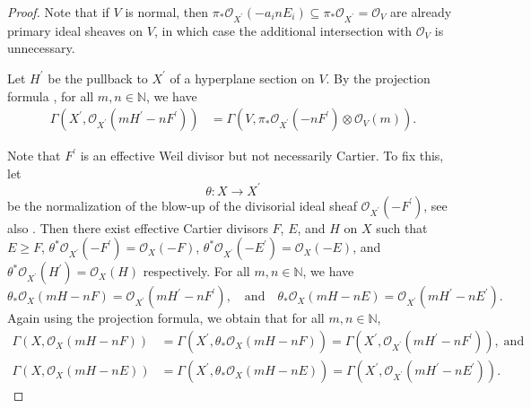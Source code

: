 \documentclass[12pt,a4paper]{amsart}
\theoremstyle{plain}
\theoremstyle{definition}
\numberwithin{equation}{theorem}
\begin{document}
\begin{proof}
Note that if $V$ is normal, then $\pi_*\mathcal{O}_{X^{\prime}}(-a_inE_i) \subseteq \pi_*\mathcal{O}_{X^{\prime}} = \mathcal{O}_{V}$ are already primary ideal sheaves on $V$, in which case the additional intersection with $\mathcal{O}_V$ is unnecessary.

Let $H^\prime$ be the pullback to $X^{\prime}$ of a hyperplane section on $V$. By the projection formula \cite[Chapter II, Exercise 5.1]{Har77}, for all $m,n\in\mathbb{N}$, we have
\begin{align}\label{reesval2}
 \Gamma\left(X^{\prime},\mathcal{O}_{X^{\prime}}(mH^{\prime}-nF^{\prime})\right) &= \Gamma\left(V,\pi_*\mathcal{O}_{X^{\prime}}(-nF^{\prime})\otimes \mathcal{O}_V(m)\right).
\end{align}

Note that $F^{\prime}$ is an effective Weil divisor but not necessarily Cartier. To fix this, let $$\theta\colon X \longrightarrow X^{\prime}$$ be the normalization of the blow-up of the divisorial ideal sheaf $\mathcal{O}_{X^{\prime}}(-F^{\prime})$, see also \cite[Corollary 3.4]{FKL16}. Then there exist effective Cartier divisors $F$, $E$, and $H$ on $X$ such that $E\geq F$, $\theta^*\mathcal{O}_{X^{\prime}}(-F^{\prime}) = \mathcal{O}_X(-F)$, $\theta^*\mathcal{O}_{X^{\prime}}(-E^{\prime}) = \mathcal{O}_X(-E)$, and $\theta^*\mathcal{O}_{X^{\prime}}(H^{\prime}) = \mathcal{O}_X(H)$ respectively. For all $m,n\in\mathbb{N}$, we have
\begin{equation}\label{reesval3}
\theta_*\mathcal{O}_{X}(mH-nF) = \mathcal{O}_{X^{\prime}}(mH^{\prime}-nF^{\prime}), \quad \text{and} \quad \theta_*\mathcal{O}_{X}(mH-nE) = \mathcal{O}_{X^{\prime}}(mH^{\prime}-nE^{\prime}).
\end{equation}
Again using the projection formula, we obtain that for all $m,n\in\mathbb{N}$,
\begin{align}\label{reesval4}
 \Gamma\left(X,\mathcal{O}_{X}(mH-nF)\right) &= \Gamma\left(X^{\prime},\theta_*\mathcal{O}_{X}(mH-nF)\right) = \Gamma\left(X^{\prime},\mathcal{O}_{X^{\prime}}(mH^{\prime}-nF^{\prime})\right), \;\text{and}\\
 \Gamma\left(X,\mathcal{O}_{X}(mH-nE)\right) &= \Gamma\left(X^{\prime},\theta_*\mathcal{O}_{X}(mH-nE)\right) = \Gamma\left(X^{\prime},\mathcal{O}_{X^{\prime}}(mH^{\prime}-nE^{\prime})\right).\nonumber
\end{align}


\end{proof}
\end{document}
